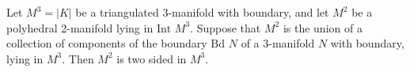 Let $M^3 = |K|$ be a triangulated 3-manifold with boundary, and let $M^2$ be a polyhedral 2-manifold lying in $\text{Int } M^3$. Suppose that $M^2$ is the union of a collection of components of the boundary $\text{Bd } N$ of a 3-manifold $N$ with boundary, lying in $M^3$. Then $M^2$ is two sided in $M^3$.
